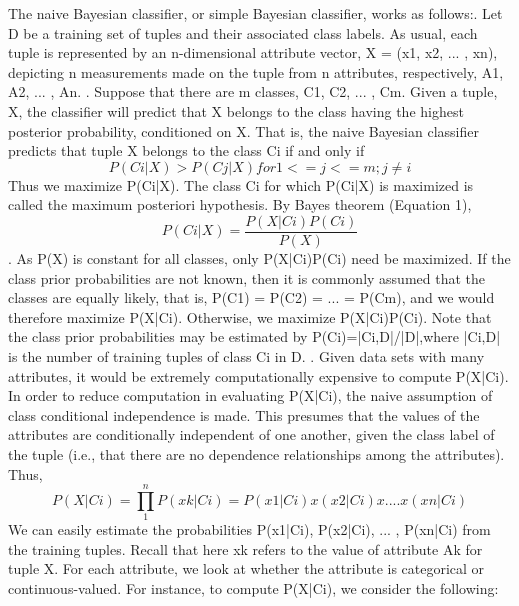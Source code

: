 \documentclass[journal]{IEEEtran}
\begin{document}
The naive Bayesian classifier, or simple Bayesian classifier, works as follows:. Let D be a training set of tuples and their associated class labels. As usual, each tuple is represented by an n-dimensional attribute vector, X = (x1, x2, ... , xn), depicting n measurements made on the tuple from n attributes, respectively, A1, A2, ... , An. . Suppose that there are m classes, C1, C2, ... , Cm. Given a tuple, X, the classifier will predict that X belongs to the class having the highest posterior probability, conditioned on X. That is, the naive Bayesian classifier predicts that tuple X belongs to the class Ci if and only if
\begin{equation}P(Ci|X) > P(Cj|X) for 1 <= j <= m; j \neq i \end{equation} 
Thus we maximize P(Ci|X). The class Ci for which P(Ci|X) is maximized is called the maximum posteriori hypothesis. By Bayes theorem (Equation 1), 
\begin{equation}P(Ci|X) = \frac{P(X|Ci)P(Ci)}{P(X)}\end{equation}
. As P(X) is constant for all classes, only P(X|Ci)P(Ci) need be maximized. If the class prior probabilities are not known, then it is commonly assumed that the classes are equally likely, that is, P(C1) = P(C2) = ... = P(Cm), and we would therefore maximize P(X|Ci). Otherwise, we maximize P(X|Ci)P(Ci). Note that the class prior probabilities may be estimated by P(Ci)=|Ci,D|/|D|,where |Ci,D| is the number of training tuples of class Ci in D. . Given data sets with many attributes, it would be extremely computationally expensive to compute P(X|Ci). In order to reduce computation in evaluating P(X|Ci), the naive assumption of class conditional independence is made. This presumes that the values of the attributes are conditionally independent of one another, given the class label of the tuple (i.e., that there are no dependence relationships among the attributes). Thus, 
\begin{equation}P(X|Ci) = \prod_{1}^{n}P(xk|Ci)
	= P(x1|Ci)x(x2|Ci)x....x(xn|Ci)\end{equation}
We can easily estimate the probabilities P(x1|Ci), P(x2|Ci), ... , P(xn|Ci) from the training tuples. Recall that here xk refers to the value of attribute Ak for tuple X. For each attribute, we look at whether the attribute is categorical or continuous-valued. For instance, to compute P(X|Ci), we consider the following:
\end{document}
